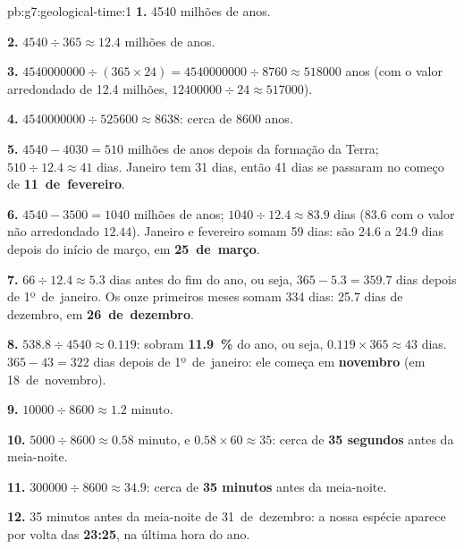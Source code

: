 \begin{solution}{pb:g7:geological-time:1}
\textbf{1.} \num{4540} milhões de anos.

\textbf{2.} $4540 \div 365 \approx 12.4$ milhões de anos.

\textbf{3.} $\num{4540000000} \div (365 \times 24) = \num{4540000000}
\div 8760 \approx \num{518000}$ anos (com o valor arredondado de
\num{12.4} milhões, $\num{12400000} \div 24 \approx \num{517000}$).

\textbf{4.} $\num{4540000000} \div \num{525600} \approx 8638$: cerca de
\num{8600} anos.

\textbf{5.} $4540 - 4030 = 510$ milhões de anos depois da formação da
Terra; $510 \div 12.4 \approx 41$ dias. Janeiro tem 31 dias, então 41
dias se passaram no começo de \textbf{11~de~fevereiro}.

\textbf{6.} $4540 - 3500 = 1040$ milhões de anos; $1040 \div 12.4 \approx
83.9$ dias (83.6 com o valor não arredondado $12.44$). Janeiro e fevereiro
somam 59 dias: são 24.6 a 24.9 dias depois do início de março, em \textbf{25~de~março}.

\textbf{7.} $66 \div 12.4 \approx 5.3$ dias antes do fim do ano, ou seja,
$365 - 5.3 = 359.7$ dias depois de 1º~de~janeiro. Os onze primeiros meses
somam 334 dias: 25.7 dias de dezembro, em \textbf{26~de~dezembro}.

\textbf{8.} $538.8 \div 4540 \approx 0.119$: sobram \textbf{11.9~\%} do
ano, ou seja, $0.119 \times 365 \approx 43$ dias. $365 - 43 =
322$ dias depois de 1º~de~janeiro: ele começa em \textbf{novembro} (em
18~de~novembro).

\textbf{9.} $\num{10000} \div 8600 \approx 1.2$ minuto.

\textbf{10.} $5000 \div 8600 \approx 0.58$ minuto, e $0.58 \times 60
\approx 35$: cerca de \textbf{35 segundos} antes da meia-noite.

\textbf{11.} $\num{300000} \div 8600 \approx 34.9$: cerca de \textbf{35
minutos} antes da meia-noite.

\textbf{12.} 35 minutos antes da meia-noite de 31~de~dezembro: a nossa
espécie aparece por volta das \textbf{23:25}, na última hora do ano.
\end{solution}
